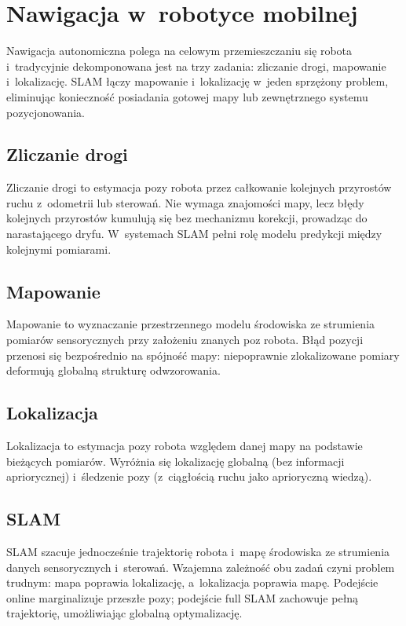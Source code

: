 \section{Nawigacja w~robotyce mobilnej}

Nawigacja autonomiczna polega na celowym przemieszczaniu się robota
i~tradycyjnie dekomponowana jest na trzy zadania: zliczanie drogi, mapowanie
i~lokalizację.
SLAM łączy mapowanie i~lokalizację w~jeden sprzężony problem, eliminując
konieczność posiadania gotowej mapy lub zewnętrznego systemu pozycjonowania.

\subsection{Zliczanie drogi}

Zliczanie drogi to estymacja pozy robota przez całkowanie kolejnych przyrostów
ruchu z~odometrii lub sterowań.
Nie wymaga znajomości mapy, lecz błędy kolejnych przyrostów kumulują się
bez mechanizmu korekcji, prowadząc do narastającego dryfu.
W~systemach SLAM pełni rolę modelu predykcji między kolejnymi pomiarami.

\subsection{Mapowanie}

Mapowanie to wyznaczanie przestrzennego modelu środowiska ze strumienia pomiarów
sensorycznych przy założeniu znanych poz robota.
Błąd pozycji przenosi się bezpośrednio na spójność mapy: niepoprawnie
zlokalizowane pomiary deformują globalną strukturę odwzorowania.

\subsection{Lokalizacja}

Lokalizacja to estymacja pozy robota względem danej mapy na podstawie
bieżących pomiarów.
Wyróżnia się lokalizację globalną (bez informacji apriorycznej) i~śledzenie
pozy (z~ciągłością ruchu jako aprioryczną wiedzą).

\subsection{SLAM}

SLAM szacuje jednocześnie trajektorię robota i~mapę środowiska ze strumienia
danych sensorycznych i~sterowań.
Wzajemna zależność obu zadań czyni problem trudnym: mapa poprawia lokalizację,
a~lokalizacja poprawia mapę.
Podejście online marginalizuje przeszłe pozy; podejście full SLAM zachowuje
pełną trajektorię, umożliwiając globalną optymalizację.

